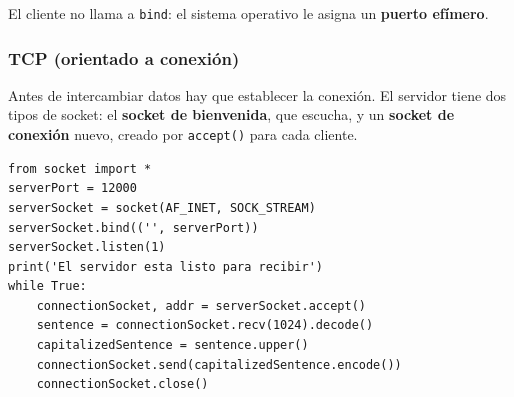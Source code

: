 \documentclass[11pt,a4paper]{article}
\begin{document}
El cliente no llama a \texttt{bind}: el sistema operativo le asigna un \textbf{puerto efímero}.

\subsubsection{TCP (orientado a conexión)}

Antes de intercambiar datos hay que establecer la conexión. El servidor tiene dos tipos de socket: el \textbf{socket de bienvenida}, que escucha, y un \textbf{socket de conexión} nuevo, creado por \texttt{accept()} para cada cliente.

\begin{center}
\end{center}

\begin{lstlisting}[language=pyr,caption={TCPServer.py}]
from socket import *
serverPort = 12000
serverSocket = socket(AF_INET, SOCK_STREAM)
serverSocket.bind(('', serverPort))
serverSocket.listen(1)
print('El servidor esta listo para recibir')
while True:
    connectionSocket, addr = serverSocket.accept()
    sentence = connectionSocket.recv(1024).decode()
    capitalizedSentence = sentence.upper()
    connectionSocket.send(capitalizedSentence.encode())
    connectionSocket.close()
\end{lstlisting}
\end{document}
